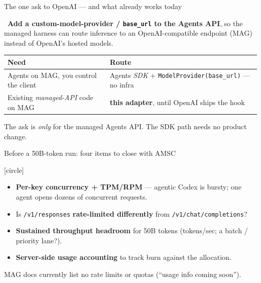 \begin{frame}{The one ask to OpenAI --- and what already works today}
  \begin{calloutbox}[labnavy]
    \faBullhorn\ \textbf{Add a custom-model-provider / \texttt{base\_url} to the
    Agents API}, so the managed harness can route inference to an
    OpenAI-compatible endpoint (MAG) instead of OpenAI's hosted models.
  \end{calloutbox}
  \vspace{8pt}
  \small
  \begin{center}
  \renewcommand{\arraystretch}{1.25}
  \begin{tabular}{@{}l l@{}}
    \toprule
    \textbf{Need} & \textbf{Route} \\
    \midrule
    Agents on MAG, you control the client & Agents \emph{SDK} + \texttt{ModelProvider(base\_url)} --- no infra \\
    Existing \emph{managed-API} code on MAG & \textbf{this adapter}, until OpenAI ships the hook \\
    \bottomrule
  \end{tabular}
  \end{center}
  \vspace{6pt}
  \begin{center}
    {\footnotesize\color{midgray}The ask is \emph{only} for the managed Agents
    API. The SDK path needs no product change.}
  \end{center}
\end{frame}

\begin{frame}{Before a 50B-token run: four items to close with AMSC}
  \begin{center}
  \begin{minipage}{0.9\textwidth}
    [circle]
    \begin{itemize}
      \item[\faIcon{tachometer-alt}] \textbf{Per-key concurrency + TPM/RPM} --- agentic
        Codex is bursty; one agent opens dozens of concurrent requests.
      \item[\faIcon{exchange-alt}] Is \texttt{/v1/responses} \textbf{rate-limited
        differently} from \texttt{/v1/chat/completions}?
      \item[\faChartLine] \textbf{Sustained throughput headroom} for 50B tokens
        (tokens/sec; a batch / priority lane?).
      \item[\faReceipt] \textbf{Server-side usage accounting} to track burn
        against the allocation.
    \end{itemize}
  \end{minipage}
  \end{center}
  \vspace{6pt}
  \begin{center}
    {\footnotesize\color{midgray}MAG docs currently list no rate limits or quotas
    (``usage info coming soon'').}
  \end{center}
\end{frame}

